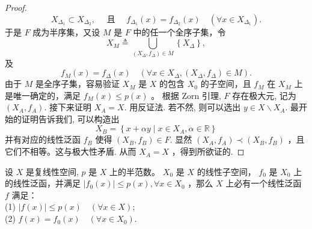 \documentclass[lang=cn,newtx,10pt,scheme=chinese,thmcnt=chapter]{elegantbook}
\begin{document}
\begin{proof}
\begin{equation*}
X _{\Delta_1} \subset X _{\Delta_2}, \quad \text { 且 } \quad f_{\Delta_1}(x)=f_{\Delta_2}(x) \quad\left(\forall x \in X _{\Delta_1}\right) .
\end{equation*}
于是 $F$ 成为半序集，又设 $M$ 是 $F$ 中的任一个全序子集，令
\begin{equation*}
X _M \triangleq \bigcup_{\left( X _{\Delta}, f_{\Delta}\right) \in M}\left\{ X _{\Delta}\right\},
\end{equation*}
及
\begin{equation*}
f_M(x)=f_{\Delta}(x) \quad\left(\forall x \in X _{\Delta},\left( X _{\Delta}, f_{\Delta}\right) \in M\right) .
\end{equation*}
由于 $M$ 是全序子集，容易验证 $X _M$ 是 $X$ 的包含 $X _0$ 的子空间，且 $f_M$ 在 $X _M$ 上是唯一确定的，满足 $f_M(x) \leqslant p(x)$ 。
根据 Zorn 引理, $F$ 存在极大元, 记为 $\left(X_A, f_A\right)$. 接下来证明 $X_A=X$. 用反证法. 若不然, 则可以选出 $y \in X \backslash X_A$. 最开始的证明告诉我们, 可以构造出
\begin{equation*}
X_B=\left\{x+\alpha y \mid x \in X_A, \alpha \in \mathbb{R} \right\}
\end{equation*}
并有对应的线性泛函 $f_B$ 使得 $\left(X_B, f_B\right) \in F$. 显然 $\left(X_A, f_A\right) \prec\left(X_B, f_B\right)$ ，且它们不相等。这与极大性矛盾. 从而 $X_A=X$ ，得到所欲证的.
\end{proof}
\begin{theorem}设 $X$ 是复线性空间, $p$ 是 $X$ 上的半范数。 $X _0$ 是 $X$ 的线性子空间， $f_0$ 是 $X _0$ 上的线性泛函，并满足 $\left|f_0(x)\right| \leqslant p(x), \forall x \in X _0$ ，那么 $X$ 上必有一个线性泛函 $f$ 满足：\\
(1) $|f(x)| \leqslant p(x) \quad(\forall x \in X )$;\\
(2) $f(x)=f_0(x) \quad\left(\forall x \in X _0\right)$.
\end{theorem}
\end{document}
